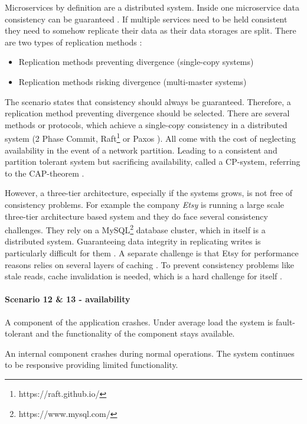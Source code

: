 Microservices by definition are a distributed system. 
Inside one microservice data consistency can be guaranteed \citep[s.36]{Wolff2016}.
If multiple services need to be held consistent they need to somehow replicate their data as their data storages are split.
There are two types of replication methods \cite{Takada2013Replication}:
\begin{itemize}
\item Replication methods preventing divergence (single-copy systems)
\item Replication methods risking divergence (multi-master systems)
\end{itemize}
The scenario states that consistency should always be guaranteed.
Therefore, a replication method preventing divergence should be selected.
There are several methods or protocols, which achieve a single-copy consistency in a distributed system (2 Phase Commit, Raft\footnote{https://raft.github.io/} or Paxos \cite{Takada2013Replication}).
All come with the cost of neglecting availability in the event of a network partition.
Leading to a consistent and partition tolerant system but sacrificing availability, called a CP-system, referring to the CAP-theorem \citep[p. 233]{Newman2015} \citep[p. 522f.]{Bass2012} \cite{Brewer2012}.

However, a three-tier architecture, especially if the systems grows, is not free of consistency problems. 
For example the company \textit{Etsy} is running a large scale three-tier architecture based system and they do face several consistency challenges.
They rely on a MySQL\footnote{https://www.mysql.com/} database cluster, which in itself is a distributed system.
Guaranteeing data integrity in replicating writes is particularly difficult for them \citep[14:50]{EtsyInterview2016}.
A separate challenge is that Etsy for performance reasons relies on several layers of caching \citep[19:00]{EtsyInterview2016}.
To prevent consistency problems like stale reads, cache invalidation is needed, which is a hard challenge for itself \citep[20:00]{EtsyInterview2016}.

\paragraph{Scenario 12 \& 13 - availability}
A component of the application crashes. Under average load the system is fault-tolerant and the functionality of the component stays available.
\label{quaMicro:s12}
\label{quaMicro:s13}

An internal component crashes during normal operations. The system continues to be responsive providing limited functionality.

